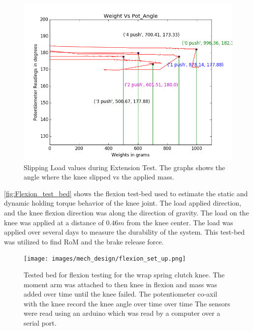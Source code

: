 \begin{figure}[h!]
    \centering
    \includegraphics[scale=0.5]{images/mech_design/weighvspot.png}
    \caption[Knee Slipping Load Values]{Slipping Load values during Extension Test. The graphs shows the angle where the knee slipped vs the applied mass.}
    \label{fig:extension_test}
\end{figure} 


\autoref{fig:Flexion_test_bed} shows the flexion test-bed used to estimate the static and dynamic holding torque behavior of the knee joint. The load applied direction, and the knee flexion direction was along the direction of gravity. The load on the knee was applied at a distance of $0.46m$ from the knee center. The load was applied over several days to measure the durability of the system. This test-bed was utilized to find RoM and the brake release force.



\begin{figure}[h]
    \centering
    \texttt{[image: images/mech\_design/flexion\_set\_up.png]}
    \caption[Flexion Test Bed]{Tested bed for flexion testing for the wrap spring clutch knee. The moment arm was attached to then knee in flexion and mass was added over time until the knee failed. The potentiometer co-axil with the knee record the knee angle over time over time The sensors were read using an arduino  which was read by a computer over a serial port.}
    \label{fig:Flexion_test_bed}
\end{figure}

